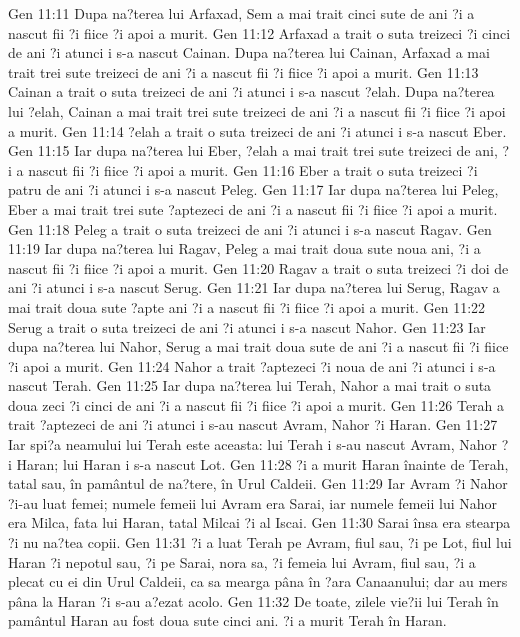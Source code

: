 Gen 11:11  Dupa na?terea lui Arfaxad, Sem a mai trait cinci sute de ani ?i a nascut fii ?i fiice ?i apoi a murit.
Gen 11:12  Arfaxad a trait o suta treizeci ?i cinci de ani ?i atunci i s-a nascut Cainan. Dupa na?terea lui Cainan, Arfaxad a mai trait trei sute treizeci de ani ?i a nascut fii ?i fiice ?i apoi a murit.
Gen 11:13  Cainan a trait o suta treizeci de ani ?i atunci i s-a nascut ?elah. Dupa na?terea lui ?elah, Cainan a mai trait trei sute treizeci de ani ?i a nascut fii ?i fiice ?i apoi a murit.
Gen 11:14  ?elah a trait o suta treizeci de ani ?i atunci i s-a nascut Eber.
Gen 11:15  Iar dupa na?terea lui Eber, ?elah a mai trait trei sute treizeci de ani, ?i a nascut fii ?i fiice ?i apoi a murit.
Gen 11:16  Eber a trait o suta treizeci ?i patru de ani ?i atunci i s-a nascut Peleg.
Gen 11:17  Iar dupa na?terea lui Peleg, Eber a mai trait trei sute ?aptezeci de ani ?i a nascut fii ?i fiice ?i apoi a murit.
Gen 11:18  Peleg a trait o suta treizeci de ani ?i atunci i s-a nascut Ragav.
Gen 11:19  Iar dupa na?terea lui Ragav, Peleg a mai trait doua sute noua ani, ?i a nascut fii ?i fiice ?i apoi a murit.
Gen 11:20  Ragav a trait o suta treizeci ?i doi de ani ?i atunci i s-a nascut Serug.
Gen 11:21  Iar dupa na?terea lui Serug, Ragav a mai trait doua sute ?apte ani ?i a nascut fii ?i fiice ?i apoi a murit.
Gen 11:22  Serug a trait o suta treizeci de ani ?i atunci i s-a nascut Nahor.
Gen 11:23  Iar dupa na?terea lui Nahor, Serug a mai trait doua sute de ani ?i a nascut fii ?i fiice ?i apoi a murit.
Gen 11:24  Nahor a trait ?aptezeci ?i noua de ani ?i atunci i s-a nascut Terah.
Gen 11:25  Iar dupa na?terea lui Terah, Nahor a mai trait o suta doua zeci ?i cinci de ani ?i a nascut fii ?i fiice ?i apoi a murit.
Gen 11:26  Terah a trait ?aptezeci de ani ?i atunci i s-au nascut Avram, Nahor ?i Haran.
Gen 11:27  Iar spi?a neamului lui Terah este aceasta: lui Terah i s-au nascut Avram, Nahor ?i Haran; lui Haran i s-a nascut Lot.
Gen 11:28  ?i a murit Haran înainte de Terah, tatal sau, în pamântul de na?tere, în Urul Caldeii.
Gen 11:29  Iar Avram ?i Nahor ?i-au luat femei; numele femeii lui Avram era Sarai, iar numele femeii lui Nahor era Milca, fata lui Haran, tatal Milcai ?i al Iscai.
Gen 11:30  Sarai însa era stearpa ?i nu na?tea copii.
Gen 11:31  ?i a luat Terah pe Avram, fiul sau, ?i pe Lot, fiul lui Haran ?i nepotul sau, ?i pe Sarai, nora sa, ?i femeia lui Avram, fiul sau, ?i a plecat cu ei din Urul Caldeii, ca sa mearga pâna în ?ara Canaanului; dar au mers pâna la Haran ?i s-au a?ezat acolo.
Gen 11:32  De toate, zilele vie?ii lui Terah în pamântul Haran au fost doua sute cinci ani. ?i a murit Terah în Haran.
